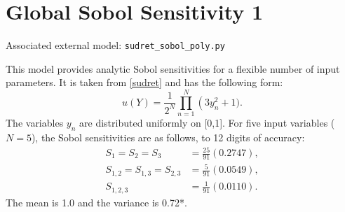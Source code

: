 \section{Global Sobol Sensitivity 1}
Associated external model: \texttt{sudret\_sobol\_poly.py}

This model provides analytic Sobol sensitivities for a flexible number of input parameters.  It is taken from
\ref{sudret} and has the following form:
\begin{equation}
  u(Y) = \frac{1}{2^N} \prod_{n=1}^N \left(3y_n^2 + 1).
\end{equation}
The variables $y_n$ are distributed uniformly on [0,1].  For five input variables ($N=5$), the Sobol sensitivities are
as follows, to 12 digits of accuracy:
\begin{align}
  S_1 = S_2 = S_3 &= \frac{25}{91} (0.2747), \\
  S_{1,2} = S_{1,3} = S_{2,3} &= \frac{5}{91} (0.0549), \\
  S_{1,2,3} &= \frac{1}{91} (0.0110).
\end{align}
The mean is 1.0 and the variance is 0.72*.
